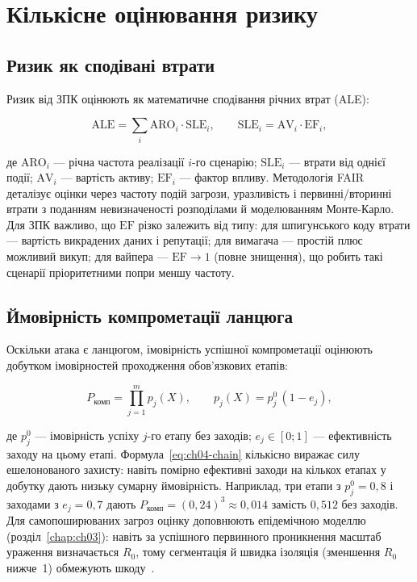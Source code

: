 \section{Кількісне оцінювання ризику}\label{sec:ch04-quant}

\subsection{Ризик як сподівані втрати}

Ризик від ЗПК оцінюють як математичне сподівання річних втрат (ALE):

\begin{equation}
\mathrm{ALE} = \sum_{i} \mathrm{ARO}_i \cdot \mathrm{SLE}_i,\qquad \mathrm{SLE}_i = \mathrm{AV}_i \cdot \mathrm{EF}_i,
\label{eq:ch04-ale}
\end{equation}

де $\mathrm{ARO}_i$ --- річна частота реалізації $i$-го сценарію; $\mathrm{SLE}_i$ --- втрати від однієї події; $\mathrm{AV}_i$ --- вартість активу; $\mathrm{EF}_i$ --- фактор впливу. Методологія FAIR~\cite{ch04:fair} деталізує оцінки через частоту подій загрози, уразливість і первинні/вторинні втрати з поданням невизначеності розподілами й моделюванням Монте-Карло. Для ЗПК важливо, що $\mathrm{EF}$ різко залежить від типу: для шпигунського коду втрати --- вартість викрадених даних і репутації; для вимагача --- простій плюс можливий викуп; для вайпера --- $\mathrm{EF}\to1$ (повне знищення), що робить такі сценарії пріоритетними попри меншу частоту.

\subsection{Ймовірність компрометації ланцюга}

Оскільки атака є ланцюгом, імовірність успішної компрометації оцінюють добутком імовірностей проходження обов'язкових етапів:

\begin{equation}
P_{\text{комп}} = \prod_{j=1}^{m} p_j(X),\qquad p_j(X) = p_j^{0}\,(1-e_j),
\label{eq:ch04-chain}
\end{equation}

де $p_j^0$ --- імовірність успіху $j$-го етапу без заходів; $e_j\in[0;1]$ --- ефективність заходу на цьому етапі. Формула~\eqref{eq:ch04-chain} кількісно виражає силу ешелонованого захисту: навіть помірно ефективні заходи на кількох етапах у добутку дають низьку сумарну ймовірність. Наприклад, три етапи з $p_j^0 = 0{,}8$ і заходами з $e_j = 0{,}7$ дають $P_{\text{комп}} = (0{,}24)^3 \approx 0{,}014$ замість $0{,}512$ без заходів. Для самопоширюваних загроз оцінку доповнюють епідемічною моделлю (розділ~\ref{chap:ch03}): навіть за успішного первинного проникнення масштаб ураження визначається $R_0$, тому сегментація й швидка ізоляція (зменшення $R_0$ нижче~1) обмежують шкоду~\cite{ch04:staniford,ch04:zou}.

